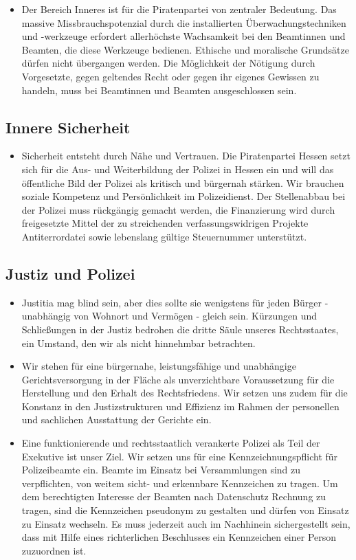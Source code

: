 \documentclass[10pt,a4paper,twocolumn,twoside,titlepage]{article}
\begin{document}

\begin{itemize}
\item Der Bereich Inneres ist für die Piratenpartei von zentraler Bedeutung. Das massive Missbrauchspotenzial durch die installierten Überwachungstechniken und -werkzeuge erfordert allerhöchste Wachsamkeit bei den Beamtinnen und Beamten, die diese Werkzeuge bedienen. Ethische und moralische Grundsätze dürfen nicht übergangen werden. Die Möglichkeit der Nötigung durch Vorgesetzte, gegen geltendes Recht oder gegen ihr eigenes Gewissen zu handeln, muss bei Beamtinnen und Beamten ausgeschlossen sein.
\end{itemize}

\subsection{Innere Sicherheit}
\begin{itemize}
\item Sicherheit entsteht durch Nähe und Vertrauen. Die Piratenpartei Hessen setzt sich für die Aus- und Weiterbildung der Polizei in Hessen ein und will das öffentliche Bild der Polizei als kritisch und bürgernah stärken. Wir brauchen soziale Kompetenz und Persönlichkeit im Polizeidienst. Der Stellenabbau bei der Polizei muss rückgängig gemacht werden, die Finanzierung wird durch freigesetzte Mittel der zu streichenden verfassungswidrigen Projekte Antiterrordatei sowie lebenslang gültige Steuernummer unterstützt.
\end{itemize}

\subsection{Justiz und Polizei}
\begin{itemize}
\item Justitia mag blind sein, aber dies sollte sie wenigstens für jeden Bürger - unabhängig von Wohnort und Vermögen - gleich sein. Kürzungen und Schließungen in der Justiz bedrohen die dritte Säule unseres Rechtsstaates, ein Umstand, den wir als nicht hinnehmbar betrachten.
\item Wir stehen für eine bürgernahe, leistungsfähige und unabhängige Gerichtsversorgung in der Fläche als unverzichtbare Voraussetzung für die Herstellung und den Erhalt des Rechtsfriedens. Wir setzen uns zudem für die Konstanz in den Justizstrukturen und Effizienz im Rahmen der personellen und sachlichen Ausstattung der Gerichte ein.
\item Eine funktionierende und rechtsstaatlich verankerte Polizei als Teil der Exekutive ist unser Ziel. Wir setzen uns für eine Kennzeichnungspflicht für Polizeibeamte ein. Beamte im Einsatz bei Versammlungen sind zu verpflichten, von weitem sicht- und erkennbare Kennzeichen zu tragen. Um dem berechtigten Interesse der Beamten nach Datenschutz Rechnung zu tragen, sind die Kennzeichen pseudonym zu gestalten und dürfen von Einsatz zu Einsatz wechseln. Es muss jederzeit auch im Nachhinein sichergestellt sein, dass mit Hilfe eines richterlichen Beschlusses ein Kennzeichen einer Person zuzuordnen ist.
\end{itemize}
\end{document}
